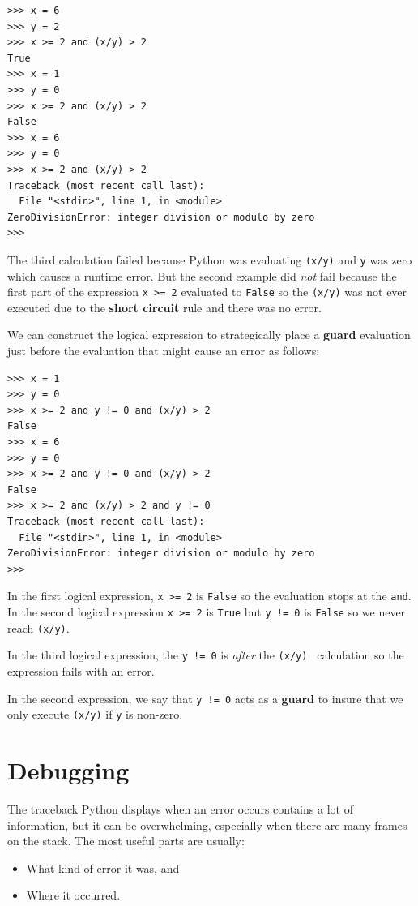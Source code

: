 \documentclass[10pt]{book}
\begin{document}
\beforeverb
\begin{verbatim}
>>> x = 6 
>>> y = 2
>>> x >= 2 and (x/y) > 2
True
>>> x = 1 
>>> y = 0
>>> x >= 2 and (x/y) > 2
False
>>> x = 6
>>> y = 0
>>> x >= 2 and (x/y) > 2
Traceback (most recent call last):
  File "<stdin>", line 1, in <module>
ZeroDivisionError: integer division or modulo by zero
>>> 
\end{verbatim}
\afterverb
%
The third calculation failed because Python was evaluating {\tt (x/y)}
and {\tt y} was zero which causes a runtime error.  But the second example
did \emph{not} fail because the first part of the expression {\tt x >= 2} 
evaluated to {\tt False} so the {\tt (x/y)} was not ever executed 
due to the {\bf short circuit} rule and there was no error.

We can construct the logical expression to strategically place a {\bf guard}
evaluation just before the evaluation that might cause an error as follows:

\beforeverb
\begin{verbatim}
>>> x = 1
>>> y = 0
>>> x >= 2 and y != 0 and (x/y) > 2
False
>>> x = 6 
>>> y = 0
>>> x >= 2 and y != 0 and (x/y) > 2
False
>>> x >= 2 and (x/y) > 2 and y != 0
Traceback (most recent call last):
  File "<stdin>", line 1, in <module>
ZeroDivisionError: integer division or modulo by zero
>>>
\end{verbatim}
\afterverb
%
In the first logical expression, {\tt x >= 2} is {\tt False} so the evaluation
stops at the {\tt and}.  In the second logical expression {\tt x >= 2} is {\tt True}
but {\tt y != 0} is {\tt False} so we never reach {\tt (x/y)}.

In the third logical expression, the {\tt y != 0} is \emph{after} the 
{\tt (x/y) } calculation so the expression fails with an error.

In the second expression, we say that {\tt y != 0} acts as a {\bf guard}
to insure that we only execute {\tt (x/y)} if {\tt y} is non-zero.


\section{Debugging}
\label{whitespace}

The traceback Python displays when an error occurs contains
a lot of information, but it can be overwhelming, especially
when there are many frames on the stack.  The most
useful parts are usually:

\begin{itemize}

\item What kind of error it was, and

\item Where it occurred.

\end{itemize}
\end{document}
